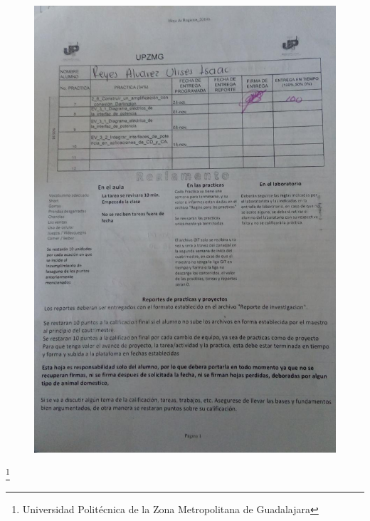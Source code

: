 \documentclass[10pt,a4paper]{article}
\begin{document}
\begin{figure}[hbtp]
\centering
\includegraphics[scale=0.43]{Pictures/Firma.jpeg}
\end{figure}

\footnote{Universidad Politécnica de la Zona Metropolitana de Guadalajara}
\end{document}
